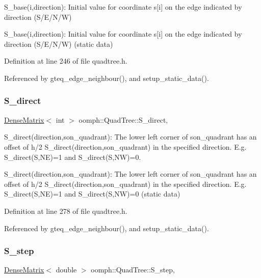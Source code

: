 S\+\_\+base(i,direction)\+: Initial value for coordinate s\mbox{[}i\mbox{]} on the edge indicated by direction (S/\+E/\+N/W) 

S\+\_\+base(i,direction)\+: Initial value for coordinate s\mbox{[}i\mbox{]} on the edge indicated by direction (S/\+E/\+N/W) (static data) 

Definition at line 246 of file quadtree.\+h.



Referenced by gteq\+\_\+edge\+\_\+neighbour(), and setup\+\_\+static\+\_\+data().

\mbox{\label{classoomph_1_1QuadTree_aa63584c3432487cd6c965c92e09ce8d3}} 
\subsubsection{\texorpdfstring{S\+\_\+direct}{S\_direct}}
{\footnotesize\ttfamily \hyperlink{classoomph_1_1DenseMatrix}{Dense\+Matrix}$<$ int $>$ oomph\+::\+Quad\+Tree\+::\+S\+\_\+direct\hspace{0.3cm}{\ttfamily [static]}, {\ttfamily [private]}}



S\+\_\+direct(direction,son\+\_\+quadrant)\+: The lower left corner of son\+\_\+quadrant has an offset of h/2 S\+\_\+direct(direction,son\+\_\+quadrant) in the specified direction. E.\+g. S\+\_\+direct(\+S,\+N\+E)=1 and S\+\_\+direct(\+S,\+N\+W)=0. 

S\+\_\+direct(direction,son\+\_\+quadrant)\+: The lower left corner of son\+\_\+quadrant has an offset of h/2 S\+\_\+direct(direction,son\+\_\+quadrant) in the specified direction. E.\+g. S\+\_\+direct(\+S,\+N\+E)=1 and S\+\_\+direct(\+S,\+N\+W)=0 (static data) 

Definition at line 278 of file quadtree.\+h.



Referenced by gteq\+\_\+edge\+\_\+neighbour(), and setup\+\_\+static\+\_\+data().

\mbox{\label{classoomph_1_1QuadTree_a24da4f560f767a69d2dfbee82e404ad9}} 
\subsubsection{\texorpdfstring{S\+\_\+step}{S\_step}}
{\footnotesize\ttfamily \hyperlink{classoomph_1_1DenseMatrix}{Dense\+Matrix}$<$ double $>$ oomph\+::\+Quad\+Tree\+::\+S\+\_\+step\hspace{0.3cm}{\ttfamily [static]}, {\ttfamily [private]}}



